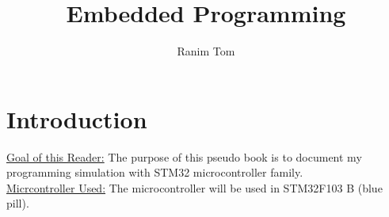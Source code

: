 \documentclass[12pt,a4paper]{book}
\title{Embedded Programming}
\author{Ranim Tom}
\begin{document}
% 



\maketitle

\tableofcontents



\printnomenclature




\listoftodos


\pagestyle{fancy}
\fancyhf{} %
\rhead{\rightmark}



\chapter{Introduction}

\underline{Goal of this Reader:} The purpose of this pseudo book is to document my programming simulation with STM32 microcontroller family.\\

\underline{Micrcontroller Used:} 
The microcontroller will be used in STM32F103 B (blue pill).


















\end{document}
